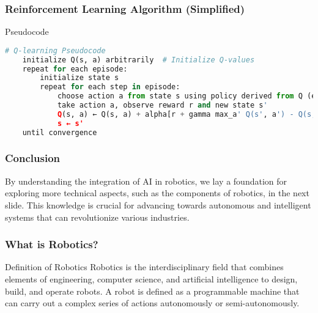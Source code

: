 \documentclass[aspectratio=169]{beamer}
\begin{document}
\begin{frame}[fragile]
    \frametitle{Reinforcement Learning Algorithm (Simplified)}
    \begin{block}{Pseudocode}
    \begin{lstlisting}[language=Python]
    # Q-learning Pseudocode
    initialize Q(s, a) arbitrarily  # Initialize Q-values
    repeat for each episode:
        initialize state s
        repeat for each step in episode:
            choose action a from state s using policy derived from Q (e.g., epsilon-greedy)
            take action a, observe reward r and new state s'
            Q(s, a) ← Q(s, a) + alpha[r + gamma max_a' Q(s', a') - Q(s, a)]
            s ← s'
    until convergence
    \end{lstlisting}
    \end{block}
\end{frame}

\begin{frame}[fragile]
    \frametitle{Conclusion}
    By understanding the integration of AI in robotics, we lay a foundation for exploring more technical aspects, such as the components of robotics, in the next slide. This knowledge is crucial for advancing towards autonomous and intelligent systems that can revolutionize various industries.
\end{frame}

\begin{frame}[fragile]
    \frametitle{What is Robotics?}
    \begin{block}{Definition of Robotics}
        Robotics is the interdisciplinary field that combines elements of engineering, computer science, and artificial intelligence to design, build, and operate robots. A robot is defined as a programmable machine that can carry out a complex series of actions autonomously or semi-autonomously.
    \end{block}
\end{frame}
\end{document}
